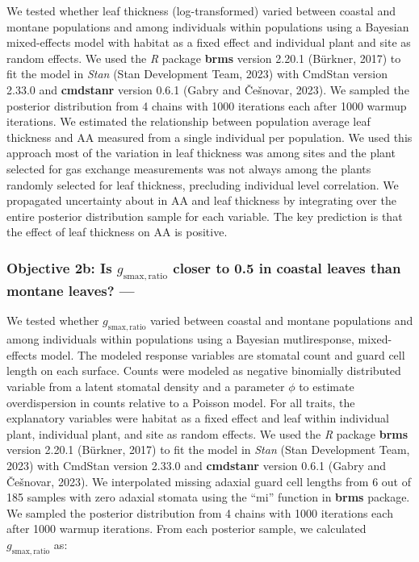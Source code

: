 \documentclass[
  letterpaper,
  DIV=11,
  numbers=noendperiod]{scrartcl}
\begin{document}
We tested whether leaf thickness (log-transformed) varied between
coastal and montane populations and among individuals within populations
using a Bayesian mixed-effects model with habitat as a fixed effect and
individual plant and site as random effects. We used the \emph{R}
package \textbf{brms} version 2.20.1 (Bürkner, 2017) to fit the model in
\emph{Stan} (Stan Development Team, 2023) with CmdStan version 2.33.0
and \textbf{cmdstanr} version 0.6.1 (Gabry and Češnovar, 2023). We
sampled the posterior distribution from 4 chains with 1000 iterations
each after 1000 warmup iterations. We estimated the relationship between
population average leaf thickness and \(\mathrm{AA}\) measured from a
single individual per population. We used this approach most of the
variation in leaf thickness was among sites and the plant selected for
gas exchange measurements was not always among the plants randomly
selected for leaf thickness, precluding individual level correlation. We
propagated uncertainty about in \(\mathrm{AA}\) and leaf thickness by
integrating over the entire posterior distribution sample for each
variable. The key prediction is that the effect of leaf thickness on
\(\mathrm{AA}\) is positive.

\hypertarget{objective-2b-is-g_mathrmsmaxratio-closer-to-0.5-in-coastal-leaves-than-montane-leaves}{%
\subsubsection{\texorpdfstring{Objective 2b: Is
\(g_{\mathrm{smax,ratio}}\) closer to 0.5 in coastal leaves than montane
leaves?
---}{Objective 2b: Is g\_\{\textbackslash mathrm\{smax,ratio\}\} closer to 0.5 in coastal leaves than montane leaves? ---}}\label{objective-2b-is-g_mathrmsmaxratio-closer-to-0.5-in-coastal-leaves-than-montane-leaves}}

We tested whether \(g_\mathrm{smax,ratio}\) varied between coastal and
montane populations and among individuals within populations using a
Bayesian mutliresponse, mixed-effects model. The modeled response
variables are stomatal count and guard cell length on each surface.
Counts were modeled as negative binomially distributed variable from a
latent stomatal density and a parameter \(\phi\) to estimate
overdispersion in counts relative to a Poisson model. For all traits,
the explanatory variables were habitat as a fixed effect and leaf within
individual plant, individual plant, and site as random effects. We used
the \emph{R} package \textbf{brms} version 2.20.1 (Bürkner, 2017) to fit
the model in \emph{Stan} (Stan Development Team, 2023) with CmdStan
version 2.33.0 and \textbf{cmdstanr} version 0.6.1 (Gabry and Češnovar,
2023). We interpolated missing adaxial guard cell lengths from 6 out of
185 samples with zero adaxial stomata using the ``mi'' function in
\textbf{brms} package. We sampled the posterior distribution from 4
chains with 1000 iterations each after 1000 warmup iterations. From each
posterior sample, we calculated \(g_{\mathrm{smax,ratio}}\) as:
\end{document}
